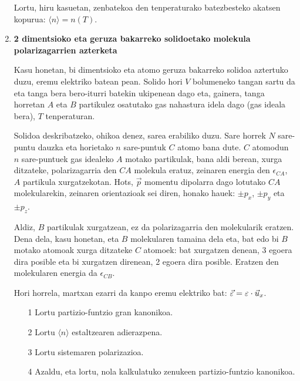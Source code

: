 \documentclass[10pt]{article}              %
\begin{document}
\begin{enumerate}
Lortu, hiru kasuetan, zenbatekoa den tenperaturako batezbesteko akatsen kopurua: $\langle n \rangle = n(T)$.

\vspace{0.5cm}



\item {\bf{2 dimentsioko eta geruza bakarreko solidoetako molekula polarizagarrien azterketa}} 

\item[] Kasu honetan, bi dimentsioko eta atomo geruza bakarreko solidoa aztertuko duzu, eremu elektriko batean pean. Solido hori $V$ bolumeneko tangan sartu da eta tanga bera bero-iturri batekin ukipenean dago eta, gainera, tanga horretan $A$ eta $B$ partikulez osatutako gas nahastura idela dago (gas ideala bera), $T$ tenperaturan. 

Solidoa deskribatzeko, ohikoa denez, sarea erabiliko duzu. Sare horrek $N$ sare-puntu dauzka eta horietako $n$ sare-puntuk $C$ atomo bana dute. $C$ atomodun $n$ sare-puntuek gas idealeko $A$  motako partikulak, bana aldi berean, xurga ditzateke, polarizagarria den $CA$ molekula eratuz, zeinaren energia den $\epsilon_{CA}$, $A$ partikula xurgatzekotan. Hots, $\vec{p}$ momentu dipolarra dago lotutako $CA$ molekularekin, zeinaren orientazioak sei diren, honako hauek: $\pm p_{x}$, $\pm p_{y}$ eta $\pm p_{z}$. 

Aldiz, $B$ partikulak xurgatzean, ez da polarizagarria den molekularik eratzen. Dena dela, kasu honetan, eta $B$ molekularen tamaina dela eta, bat edo bi $B$ motako atomoak xurga ditzateke $C$ atomoek: bat xurgatzen denean, 3 egoera dira posible eta bi xurgatzen direnean, 2 egoera dira posible. Eratzen den molekularen energia da $\epsilon_{CB}$.

Hori horrela, martxan ezarri da kanpo eremu elektriko bat: ${\large{\vec{\varepsilon}}}={\large{\varepsilon}}\cdot \vec{u}_{x} $. 

\begin{enumerate}
\item[1] Lortu partizio-funtzio gran kanonikoa.
\item[2] Lortu $\langle n \rangle$ estaltzearen adierazpena.
\item[3] Lortu sistemaren polarizazioa.
\item[4] Azaldu, eta lortu, nola kalkulatuko zenukeen partizio-funtzio kanonikoa.


\end{enumerate}

\vspace{0.5cm}


\end{enumerate}
\end{document}
